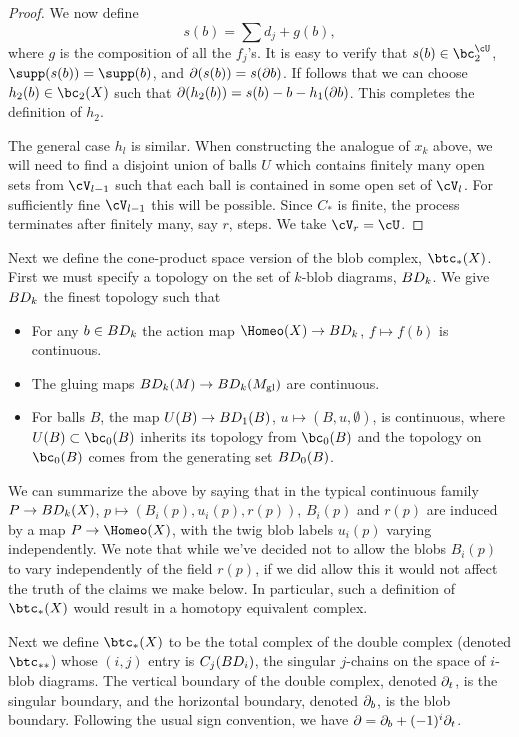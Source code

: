 \begin{proof}
We now define 
\[
	s(b) = \sum d_j + g(b),
\]
where $g$ is the composition of all the $f_j$'s.
It is easy to verify that $s(b) \in \sbc_2$, $\supp(s(b)) = \supp(b)$, and 
$\partial(s(b)) = s(\partial b)$.
If follows that we can choose $h_2(b)\in \bc_2(X)$ such that $\partial(h_2(b)) = s(b) - b - h_1(\partial b)$.
This completes the definition of $h_2$.

The general case $h_l$ is similar.
When constructing the analogue of $x_k$ above, we will need to find a disjoint union of balls $U$
which contains finitely many open sets from $\cV_{l-1}$
such that each ball is contained in some open set of $\cV_l$.
For sufficiently fine $\cV_{l-1}$ this will be possible.
Since $C_*$ is finite, the process terminates after finitely many, say $r$, steps.
We take $\cV_r = \cU$.
\end{proof}


\medskip

Next we define the cone-product space version of the blob complex, $\btc_*(X)$.
First we must specify a topology on the set of $k$-blob diagrams, $BD_k$.
We give $BD_k$ the finest topology such that
\begin{itemize}
\item For any $b\in BD_k$ the action map $\Homeo(X) \to \BD_k$, $f \mapsto f(b)$ is continuous.
\item The gluing maps $BD_k(M)\to BD_k(M_\mathrm{gl})$ are continuous.
\item For balls $B$, the map $U(B) \to BD_1(B)$, $u\mapsto (B, u, \emptyset)$, is continuous,
where $U(B) \sub \bc_0(B)$ inherits its topology from $\bc_0(B)$ and the topology on
$\bc_0(B)$ comes from the generating set $BD_0(B)$. 
\end{itemize}

We can summarize the above by saying that in the typical continuous family
$P\to BD_k(X)$, $p\mapsto \left(B_i(p), u_i(p), r(p)\right)$, $B_i(p)$ and $r(p)$ are induced by a map
$P\to \Homeo(X)$, with the twig blob labels $u_i(p)$ varying independently.
We note that while we've decided not to allow the blobs $B_i(p)$ to vary independently of the field $r(p)$,
if we did allow this it would not affect the truth of the claims we make below.
In particular, such a definition of $\btc_*(X)$ would result in a homotopy equivalent complex.

Next we define $\btc_*(X)$ to be the total complex of the double complex (denoted $\btc_{**}$) 
whose $(i,j)$ entry is $C_j(BD_i)$, the singular $j$-chains on the space of $i$-blob diagrams.
The vertical boundary of the double complex,
denoted $\partial_t$, is the singular boundary, and the horizontal boundary, denoted $\partial_b$, is
the blob boundary. Following the usual sign convention, we have $\partial = \partial_b + (-1)^i \partial_t$.

